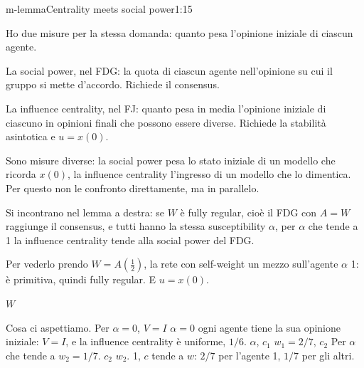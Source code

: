 \begin{slidedue}{m-lemma}{Centrality meets social power}{1:15 {\color{red}}}
  \begin{discorso}
    \item {\color{blue}Ho due misure per la stessa domanda: quanto pesa l'opinione iniziale di ciascun agente.}
    \item {\color{blue}La social power, nel FDG: la quota di ciascun agente nell'opinione su cui il gruppo si mette d'accordo. Richiede il consensus.}
    \item {\color{blue}La influence centrality, nel FJ: quanto pesa in media l'opinione iniziale di ciascuno in opinioni finali che possono essere diverse. Richiede la stabilità asintotica e $u=x(0)$.}
    \item {\color{blue}Sono misure diverse: la social power pesa lo stato iniziale di un modello che ricorda $x(0)$, la influence centrality l'ingresso di un modello che lo dimentica. Per questo non le confronto direttamente, ma in parallelo.}
    \item {\color{blue}Si incontrano nel lemma a destra: se $W$ è fully regular, cioè il FDG con $A=W$ raggiunge il consensus, e tutti hanno la stessa susceptibility $\alpha$, per $\alpha$ che tende a 1 la influence centrality tende alla social power del FDG.}
    \item Per {\color{red}   } {\color{blue}vederlo} prendo $W=A(\tfrac12)$, la rete con self-weight un mezzo sull'agente {\color{red}    } {\color{red}$\alpha$} {\color{red}  } {\color{blue}1: è primitiva, quindi fully regular. E} $u=x(0)$.
    \item {\color{red}$W$} {\color{red}             }
    \item {\color{blue}Cosa ci aspettiamo.} Per {\color{red}$\alpha=0$,} {\color{red}$V=I$} {\color{blue}$\alpha=0$ ogni agente tiene la sua opinione iniziale: $V=I$,} e la influence centrality è uniforme, $1/6$. {\color{red}  } {\color{red}$\alpha$,} {\color{red}$c_1$} {\color{red}    } {\color{red}$w_1=2/7$,} {\color{red}} {\color{red}$c_2$} {\color{red} } {\color{blue}Per $\alpha$ che tende} a {\color{red}$w_2=1/7$.} {\color{red} } {\color{red}$c_2$} {\color{red}   } {\color{red}$w_2$.} {\color{blue}1, $c$ tende a $w$: $2/7$ per l'agente 1, $1/7$ per gli altri.}

\end{discorso}
\end{slidedue}
